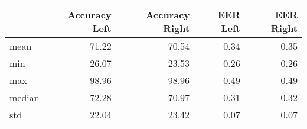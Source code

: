 \begin{tabular}{lrrrr}
\toprule
{} &  Accuracy Left &  Accuracy Right &  EER Left &  EER Right \\
\midrule
mean   &          71.22 &           70.54 &      0.34 &       0.35 \\
min    &          26.07 &           23.53 &      0.26 &       0.26 \\
max    &          98.96 &           98.96 &      0.49 &       0.49 \\
median &          72.28 &           70.97 &      0.31 &       0.32 \\
std    &          22.04 &           23.42 &      0.07 &       0.07 \\
\bottomrule
\end{tabular}
